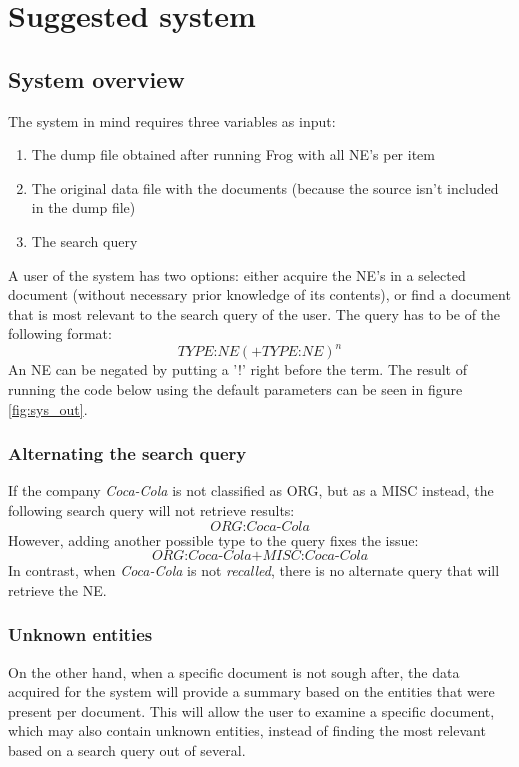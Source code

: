 \section{Suggested system} \label{app:sug_sys}
\subsection{System overview}
The system in mind requires three variables as input:
\begin{enumerate}
\item The dump file obtained after running Frog with all NE's per item
\item The original data file with the documents (because the source isn't included in the dump file)
\item The search query
\end{enumerate}
A user of the system has two options: either acquire the NE's in a selected document (without necessary prior knowledge of its contents), or find a document that is most relevant to the search query of the user. The query has to be of the following format: $$TYPE{\text{:}}NE(+TYPE{\text{:}}NE)^n$$ An NE can be negated by putting a '!' right before the term. The result of running the code below using the default parameters can be seen in figure \ref{fig:sys_out}.

\subsubsection{Alternating the search query}\label{app:alt_query}
If the company \textit{Coca-Cola} is not classified as ORG, but as a MISC instead, the following search query will not retrieve results: $$ORG\text{:}Coca\text{-}Cola$$
However, adding another possible type to the query fixes the issue:
$$ORG\text{:}Coca\text{-}Cola\text{+}MISC\text{:}Coca\text{-}Cola$$
In contrast, when \textit{Coca-Cola} is not \emph{recalled}, there is no alternate query that will retrieve the NE. 

\subsubsection{Unknown entities}
On the other hand, when a specific document is not sough after, the data acquired for the system will provide a summary based on the entities that were present per document. This will allow the user to examine a specific document, which may also contain unknown entities, instead of finding the most relevant based on a search query out of several. 

